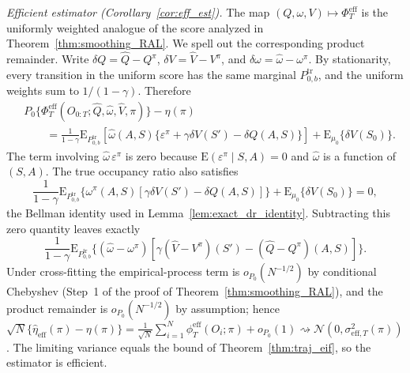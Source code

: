 \documentclass[12pt]{article}
\theoremstyle{remark}\newtheorem{remark}[theorem]{Remark}\theoremstyle{plain}
\newcommand{\E}{\mathrm{E}}
\begin{document}
\emph{Efficient estimator (Corollary~\ref{cor:eff_est}).}
The map $(Q,\omega,V)\mapsto\Phi^{\mathrm{eff}}_T$ is the uniformly
weighted analogue of the score analyzed in
Theorem~\ref{thm:smoothing_RAL}.  We spell out the corresponding
product remainder.  Write
$\delta Q=\widehat Q-Q^\pi$, $\delta V=\widehat V-V^\pi$, and
$\delta\omega=\widehat\omega-\omega^\pi$.  By stationarity, every
transition in the uniform score has the same marginal
$P_{0,b}^{\mathrm{tr}}$, and the uniform weights sum to
$1/(1-\gamma)$.  Therefore
\[
    \begin{aligned}
    &P_0\{\Phi^{\mathrm{eff}}_T
      (O_{0:T};\widehat Q,\widehat\omega,\widehat V,\pi)\}
      -\eta(\pi)\\
    &\qquad
      =
      \frac1{1-\gamma}
      \E_{P_{0,b}^{\mathrm{tr}}}
      \!\left[
      \widehat\omega(A,S)
      \{\varepsilon^\pi+\gamma\delta V(S')-\delta Q(A,S)\}
      \right]
      +\E_{\mu_0}\{\delta V(S_0)\}.
    \end{aligned}
\]
The term involving $\widehat\omega\,\varepsilon^\pi$ is zero because
$\E(\varepsilon^\pi\mid S,A)=0$ and $\widehat\omega$ is a function of
$(S,A)$.  The true occupancy ratio also satisfies
\[
    \frac1{1-\gamma}
    \E_{P_{0,b}^{\mathrm{tr}}}
    \{\omega^\pi(A,S)[\gamma\delta V(S')-\delta Q(A,S)]\}
    +\E_{\mu_0}\{\delta V(S_0)\}=0,
\]
the Bellman identity used in
Lemma~\ref{lem:exact_dr_identity}.  Subtracting this zero quantity
leaves exactly
\[
    \frac1{1-\gamma}\E_{P_{0,b}^{\mathrm{tr}}}
    \{(\widehat\omega-\omega^\pi)
    [\gamma(\widehat V-V^\pi)(S')-(\widehat Q-Q^\pi)(A,S)]\}.
\]
Under cross-fitting the empirical-process term is
$o_{P_0}(N^{-1/2})$ by conditional Chebyshev (Step~1 of the proof of
Theorem~\ref{thm:smoothing_RAL}), and the product remainder is
$o_{P_0}(N^{-1/2})$ by assumption; hence
$\sqrt N\{\widehat\eta_{\mathrm{eff}}(\pi)-\eta(\pi)\}
=\frac1{\sqrt N}\sum_{i=1}^N\phi^{\mathrm{eff}}_T(O_i;\pi)+o_{P_0}(1)
\rightsquigarrow\mathcal N(0,\sigma^2_{\mathrm{eff},T}(\pi))$.  The
limiting variance equals the bound of Theorem~\ref{thm:traj_eif}, so the
estimator is efficient.
\end{document}
